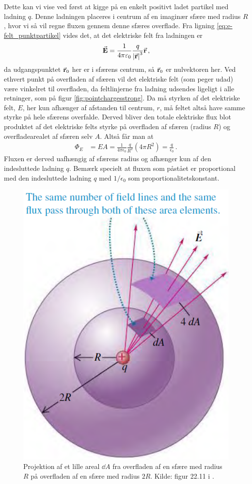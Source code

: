 Dette kan vi vise ved først at kigge på en enkelt positivt ladet partikel med ladning $q$. Denne ladningen placeres i centrum af en imaginær sfære med radius $R$, hvor vi så vil regne fluxen gennem denne sfæres overflade. Fra ligning \eqref{eq:e-felt_punktpartikel} vides det, at det elektriske felt fra ladningen er
\begin{align}
    \va{E} = \frac{1}{4\pi\varepsilon_0} \frac{q}{\abs{\va{r}}^3} \va{r} \, ,
\end{align}
da udgangspunktet $\va{r}_0$ her er i sfærens centrum, så $\va{r}_0$ er nulvektoren her. Ved ethvert punkt på overfladen af sfæren vil det elektriske felt (som peger udad) være vinkelret til overfladen, da feltlinjerne fra ladning udsendes ligeligt i alle retninger, som på figur \ref{fig:pointchargesstrong}. Da må styrken af det elektriske felt, $E$, her  kun afhænger af afstanden til centrum, $r$, må feltet altså have samme styrke på hele sfærens overfalde. Derved bliver den totale elektriske flux blot produktet af det elektriske felts styrke på overfladen af sfæren (radius $R$) og overfladearealet af sfæren selv $A$. Altså får man at
\begin{align} \label{eq:GaussLawSphere}
    \Phi_E &= EA = \frac{1}{4\pi\epsilon_0} \frac{q}{R^2} (4 \pi R^2) = \frac{q}{\epsilon_0} \, .
\end{align}
Fluxen er derved uafhængig af sfærens radius og afhænger kun af den indesluttede ladning $q$. Bemærk specielt at fluxen som påstået er proportional med den indesluttede ladning $q$ med $1/\epsilon_0$ som proportionalitetskonstant. 

\begin{figure}[h!]
    \centering
    \includegraphics[width=.4\textwidth]{Elektro/Figurer/GaussLawProjectingOntoASphere.PNG}
    \caption{Projektion af et lille areal $\dd{A}$ fra overfladen af en sfære med radius $R$ på overfladen af en sfære med radius $2R$. Kilde: figur 22.11 i \cite{youngSearsZemanskyUniversity2016}.}
    \label{fig:GaussLawProjectingOntoASphere}
\end{figure}

